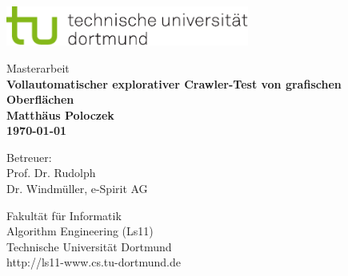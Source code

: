 \begin{titlepage}
\vspace*{-2cm}
\newlength{\links}
\setlength{\links}{-1.5cm}
\sf
\LARGE

\hspace*{\links}
\begin{minipage}{12.5cm}
\includegraphics[width=8cm]{bilder/tulogo-rgb}
\end{minipage}

\vspace*{4cm}

\hspace*{\links}
\hspace*{-0.2cm}
\begin{minipage}{9cm}
\large
\begin{center}
{\Large Masterarbeit} \\
\vspace*{1cm}
\bf{ Vollautomatischer explorativer Crawler-Test von grafischen Oberflächen } \\
\vspace*{1cm}
Matthäus Poloczek\\
\today
\end{center}
\end{minipage}

\vspace*{5.5cm}

\hspace*{\links}

\vspace*{1.5cm}

\vspace*{.6cm}

\hspace*{\links}
\begin{minipage}[b]{5cm}
\normalsize
\raggedright
Betreuer: \\
Prof. Dr. Rudolph \\
Dr. Windmüller, e-Spirit AG \\
\end{minipage}

\vspace*{2.5cm}
\hspace*{\links}
\begin{minipage}[b]{8cm}
\normalsize
\raggedright
Fakultät für Informatik\\
Algorithm Engineering (Ls11)\\
Technische Universität Dortmund \\
http://ls11-www.cs.tu-dortmund.de
\end{minipage}


\end{titlepage}
